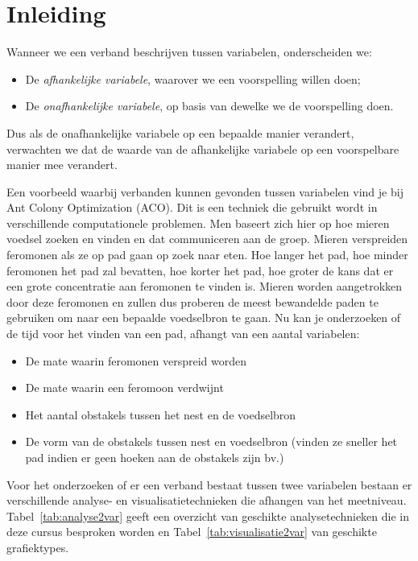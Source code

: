 \section{Inleiding}
\label{sec:analyse2var-inleiding}

Wanneer we een verband beschrijven tussen variabelen, onderscheiden we:

\begin{itemize}
  \item De \emph{afhankelijke variabele}, waarover we een voorspelling willen doen;
  \item De \emph{onafhankelijke variabele}, op basis van dewelke we de voorspelling doen.
\end{itemize}

Dus als de onafhankelijke variabele op een bepaalde manier verandert, verwachten we dat de waarde van de afhankelijke variabele op een voorspelbare manier mee verandert.

\begin{example}
  Een voorbeeld waarbij verbanden kunnen gevonden tussen variabelen vind je bij Ant Colony Optimization (ACO). Dit is een techniek die gebruikt wordt in verschillende computationele problemen. Men baseert zich hier op hoe mieren voedsel zoeken en  vinden en dat communiceren aan de groep. Mieren verspreiden feromonen als ze op pad gaan op zoek naar eten. Hoe langer het pad, hoe minder feromonen het pad zal bevatten, hoe korter het pad, hoe groter de kans dat er een grote concentratie aan feromonen te vinden is. Mieren worden aangetrokken door deze feromonen en zullen dus proberen de meest bewandelde paden te gebruiken om naar een bepaalde voedselbron te gaan. Nu kan je onderzoeken of de tijd voor het vinden van een pad, afhangt van een aantal variabelen:

  \begin{itemize}
    \item De mate waarin feromonen verspreid worden
    \item De mate waarin een feromoon verdwijnt
    \item Het aantal obstakels tussen het nest en de voedselbron
    \item De vorm van de obstakels tussen nest en voedselbron (vinden ze sneller het pad indien er geen hoeken aan de obstakels zijn bv.)
  \end{itemize}
\end{example}

Voor het onderzoeken of er een verband bestaat tussen twee variabelen bestaan er verschillende analyse- en visualisatietechnieken die afhangen van het meetniveau. Tabel~\ref{tab:analyse2var} geeft een overzicht van geschikte analysetechnieken die in deze cursus besproken worden en Tabel~\ref{tab:visualisatie2var} van geschikte grafiektypes.

